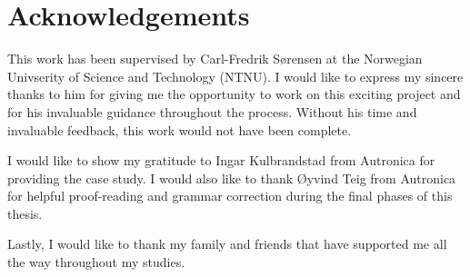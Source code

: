 \section*{\Huge Acknowledgements}
This work has been supervised by Carl-Fredrik Sørensen at the Norwegian Univserity of Science and Technology (NTNU). I would like to express my sincere thanks to him for giving me the opportunity to work on this exciting project and for his invaluable guidance throughout the process. Without his time and invaluable feedback, this work would not have been complete. 

I would like to show my gratitude to Ingar Kulbrandstad from Autronica for providing the case study. I would also like to thank Øyvind Teig from Autronica for helpful proof-reading and grammar correction during the final phases of this thesis. 

Lastly, I would like to thank my family and friends that have supported me all the way throughout my studies.